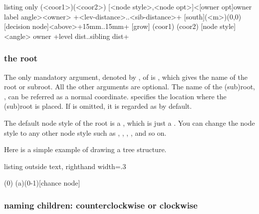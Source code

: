 \begin{tcblisting}{listing only}
  (<coor1>)(<coor2>)
          [<node style>,<node opt>]<[owner opt]owner label angle>{<owner>}
          +<lev-distance>..<sib-distance>+
  [south](<m>)(0,0)[decision node]<above>{}+15mm..15mm+
  [grow] %
  (coor1) %
  (coor2) %
  [node style] %
  <angle> %
  {owner} %
  +level dist..sibling dist+ %
\end{tcblisting}


\subsubsection*{the root}

The only mandatory argument, denoted by , of \cmd{\istroot} is , which gives the name of the root or subroot. All the other arguments are optional. The name of the (sub)root, , can be referred as a normal coordinate.
 specifies the location where the (sub)root is placed.
If  is omitted, it is regarded as  by default.

The default node style of the root is a , which is just a . You can change the node style to any other node style such as , , , , and so on.


Here is a simple example of drawing a tree structure.

\begin{tcblisting}{listing outside text, righthand width=.3\linewidth}
\begin{istgame}
\istroot(0)
  \istb  \istb  \istb  \endist
\istroot(a)(0-1)[chance node]
  \istb  \istb  \endist
\end{istgame}
\end{tcblisting}


\subsubsection*{naming children: counterclockwise or clockwise}


